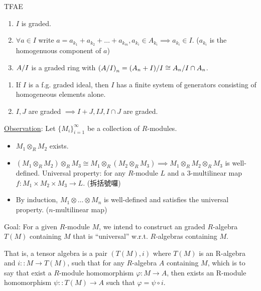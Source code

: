 \begin{exercise}
  TFAE
  \begin{enumerate}[(1)]
    \item $I$ is graded.
    \item $\forall a \in I$ write $a = a_{k_1} + a_{k_2} + \dots + a_{k_m},
      a_{k_i} \in A_{k_i} \implies a_{k_i} \in I$.
      ($a_{k_i}$ is the homogenuous component of $a$)
    \item ${A}/{I}$ is a graded ring with
      $\left({A}/{I}\right)_n = {(A_n + I)}/{I}
      \cong {A_n}/{I \cap A_n}$.
  \end{enumerate}
\end{exercise}

\begin{exercise} \mbox{}
  \begin{enumerate}[(1)]
    \item If $I$ is a f.g. graded ideal, then $I$ has a finite system of
      generators consisting of homogeneous elements alone.
    \item $I, J$ are graded $\implies I+J, IJ, I \cap J$ are graded.
  \end{enumerate}
\end{exercise}

\underline{Observation}:
Let $\{ M_i \}_{i=1}^\infty$ be a collection of $R$-modules.
\begin{itemize}
  \item $M_1 \otimes_R M_2$ exists.
  \item $(M_1 \otimes_R M_2) \otimes_R M_3 \cong
    M_1 \otimes_R (M_2 \otimes_R M_3) \implies
    M_1 \otimes_R M_2 \otimes_R M_3$ is well-defined.
    Universal property: for any $R$-module $L$ and a $3$-multilinear map
    $f: M_1 \times M_2 \times M_3 \to L$. (拆括號囉)
  \item By induction, $M_1 \otimes \dots \otimes M_n$ is well-defined and
    satisfies the universal property. ($n$-multilinear map)
\end{itemize}

Goal: For a given $R$-module $M$, we intend to construct an graded $R$-algebra
$T(M)$ containing $M$ that is ``universal'' w.r.t. $R$-algebras containing $M$.

That is, a tensor algebra is a pair $(T(M), i)$ where $T(M)$ is an R-algebra and 
$i :: M \to T(M)$, such that for any $R$-algebra $A$ containing $M$, which is to say that exist a 
$R$-module homomorphism $\varphi: M \to A$, then exists an R-module homomorphism $\psi :: T(M) \to A$ such 
that $\varphi = \psi \circ i$. \\

